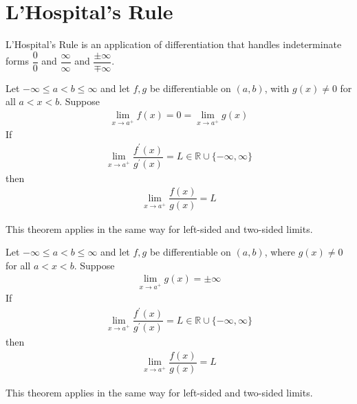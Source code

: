 \newpage
\section{L'Hospital's Rule}

L'Hospital's Rule is an application of differentiation that handles indeterminate forms $\dfrac{0}{0}$ and $\dfrac{\infty}{\infty}$ and $\dfrac{\pm \infty}{\mp \infty}$.

\vspace{0.1in}
\begin{theorem}
Let $-\infty \leq a < b \leq \infty$ and let $f, g$ be differentiable on $(a, b)$, with $g(x) \neq 0$ for all $a < x < b$. Suppose 
\begin{align*}
    \lim_{x \longrightarrow a^{+}} f(x) = 0 = \lim_{x \longrightarrow a^{+}} g(x)
\end{align*}
If
\begin{align*}
    \lim_{x \longrightarrow a^{+}} \dfrac{f^{'}(x)}{g^{'}(x)} = L \in \mathbb{R} \cup \{-\infty, \infty\}
\end{align*}
then
\begin{align*}
    \lim_{x \longrightarrow a^{+}} \dfrac{f(x)}{g(x)} = L
\end{align*}
\label{L'Hospital_1}
\end{theorem}

\begin{note}
This theorem applies in the same way for left-sided and two-sided limits.
\end{note}

\begin{theorem}
Let $-\infty \leq a < b \leq \infty$ and let $f, g$ be differentiable on $(a, b)$, where $g(x) \neq 0$ for all $a < x < b$. Suppose
\begin{align*}
    \lim_{x \longrightarrow a^{+}} g(x) = \pm \infty 
\end{align*}
If
\begin{align*}
    \lim_{x \longrightarrow a^{+}} \dfrac{f^{'}(x)}{g^{'}(x)} = L \in \mathbb{R} \cup \{-\infty, \infty\}
\end{align*}
then
\begin{align*}
    \lim_{x \longrightarrow a^{+}} \dfrac{f(x)}{g(x)} = L
\end{align*}
\label{L'Hospital_2}
\end{theorem}

\begin{note}
This theorem applies in the same way for left-sided and two-sided limits.
\end{note}

